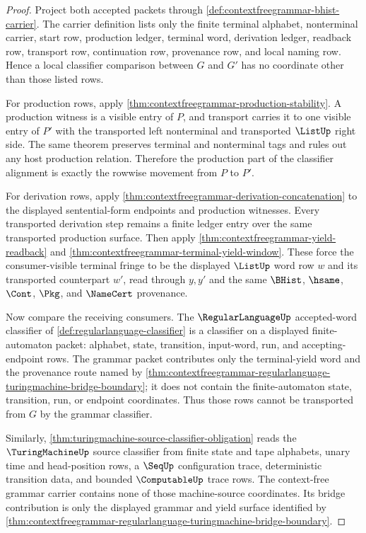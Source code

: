 \begin{proof}
Project both accepted packets through
\autoref{def:contextfreegrammar-bhist-carrier}. The carrier definition lists
only the finite terminal alphabet, nonterminal carrier, start row, production
ledger, terminal word, derivation ledger, readback row, transport row,
continuation row, provenance row, and local naming row. Hence a local
classifier comparison between $G$ and $G'$ has no coordinate other than those
listed rows.

For production rows, apply
\autoref{thm:contextfreegrammar-production-stability}. A production witness is
a visible entry of $P$, and transport carries it to one visible entry of $P'$
with the transported left nonterminal and transported $\ListUp$ right side.
The same theorem preserves terminal and nonterminal tags and rules out any
host production relation. Therefore the production part of the classifier
alignment is exactly the rowwise movement from $P$ to $P'$.

For derivation rows, apply
\autoref{thm:contextfreegrammar-derivation-concatenation} to the displayed
sentential-form endpoints and production witnesses. Every transported
derivation step remains a finite ledger entry over the same transported
production surface. Then apply
\autoref{thm:contextfreegrammar-yield-readback} and
\autoref{thm:contextfreegrammar-terminal-yield-window}. These force the
consumer-visible terminal fringe to be the displayed $\ListUp$ word row $w$
and its transported counterpart $w'$, read through $y,y'$ and the same
$\BHist$, $\hsame$, $\Cont$, $\Pkg$, and $\NameCert$ provenance.

Now compare the receiving consumers. The $\RegularLanguageUp$ accepted-word
classifier of \autoref{def:regularlanguage-classifier} is a classifier on a
displayed finite-automaton packet: alphabet, state, transition, input-word,
run, and accepting-endpoint rows. The grammar packet contributes only the
terminal-yield word and the provenance route named by
\autoref{thm:contextfreegrammar-regularlanguage-turingmachine-bridge-boundary};
it does not contain the finite-automaton state, transition, run, or endpoint
coordinates. Thus those rows cannot be transported from $G$ by the grammar
classifier.

Similarly,
\autoref{thm:turingmachine-source-classifier-obligation} reads the
$\TuringMachineUp$ source classifier from finite state and tape alphabets,
unary time and head-position rows, a $\SeqUp$ configuration trace,
deterministic transition data, and bounded $\ComputableUp$ trace rows. The
context-free grammar carrier contains none of those machine-source
coordinates. Its bridge contribution is only the displayed grammar and yield
surface identified by
\autoref{thm:contextfreegrammar-regularlanguage-turingmachine-bridge-boundary}.


\end{proof}
